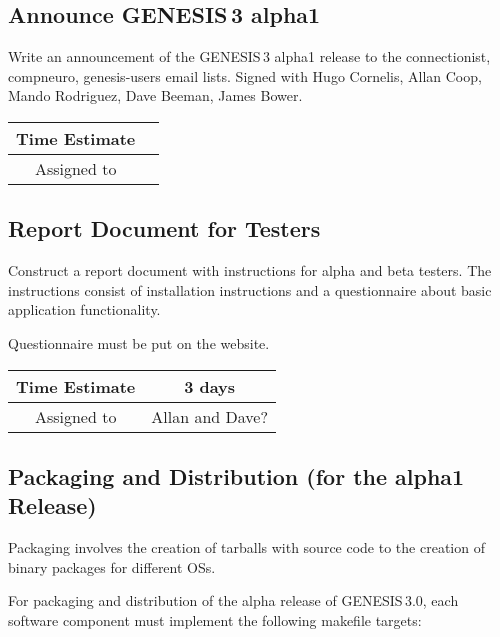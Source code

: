 \documentclass[12pt]{article}
\begin{document}
\subsection{Announce GENESIS\,3 alpha1}

Write an announcement of the GENESIS\,3 alpha1 release to the
connectionist,
compneuro,
genesis-users
email lists.  Signed with Hugo Cornelis, Allan Coop,
Mando Rodriguez, Dave Beeman, James Bower.

\begin{center}
  \vspace{5mm}
  \centering
  \begin{tabular}{|c|c|}
    \hline
    Time Estimate
    & \\
    \hline
    Assigned to
    & \\
    \hline
  \end{tabular}
\end{center}


\subsection{Report Document for Testers}

Construct a report document with instructions for alpha and beta
testers.  The instructions consist of installation instructions and a
questionnaire about basic application functionality.

Questionnaire must be put on the website.


\begin{center}
  \vspace{5mm}
  \centering
  \begin{tabular}{|c|c|}
    \hline
    Time Estimate
    & 3 days \\
    \hline
    Assigned to
    &  Allan and Dave? \\
    \hline
  \end{tabular}
\end{center}


\subsection{Packaging and Distribution (for the alpha1 Release)}

Packaging involves the creation of tarballs with source code to the
creation of binary packages for different OSs.

For packaging and distribution of the alpha release of GENESIS\,3.0,
each software component must implement the following makefile targets:
\end{document}
